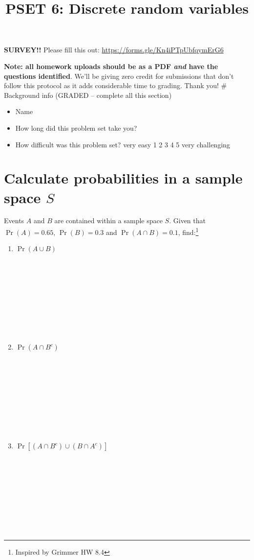 \documentclass[
]{article}
\title{PSET 6: Discrete random variables}
\author{}
\date{\vspace{-2.5em}}
\begin{document}
\maketitle

\textbf{SURVEY!!} Please fill this out:
\url{https://forms.gle/Kn4iPTpUbfqymErG6}

\textbf{Note: all homework uploads should be as a PDF \emph{and} have
the questions identified}. We'll be giving zero credit for submissions
that don't follow this protocol as it adds considerable time to grading.
Thank you! \# Background info (GRADED -- complete all this section)

\begin{itemize}
\item
  Name
\item
  How long did this problem set take you?
\item
  How difficult was this problem set? very easy 1 2 3 4 5 very
  challenging
\end{itemize}

\section{\texorpdfstring{Calculate probabilities in a sample space
\(S\)}{Calculate probabilities in a sample space S}}\label{calculate-probabilities-in-a-sample-space-s}

Events \(A\) and \(B\) are contained within a sample space \(S\). Given
that \(\Pr(A)=0.65\), \(\Pr(B)=0.3\) and \(\Pr(A \cap B) = 0.1\),
find:\footnote{Inspired by Grimmer HW 8.4}

\begin{enumerate}
\def\labelenumi{\alph{enumi}.}
\item
  \(\Pr(A \cup B)\)

  \strut \\
  \strut ~\\
  \strut ~\\
  \strut ~\\
  \strut \\
\item
  \(\Pr(A \cap B^c)\)

  \strut \\
  \strut ~\\
  \strut ~\\
  \strut ~\\
  \strut \\
\item
  \(\Pr[(A \cap B^c) \cup (B \cap A^c)]\)

  \strut \\
  \strut ~\\
  \strut ~\\
  \strut ~\\
  \strut \\
\end{enumerate}
\end{document}
